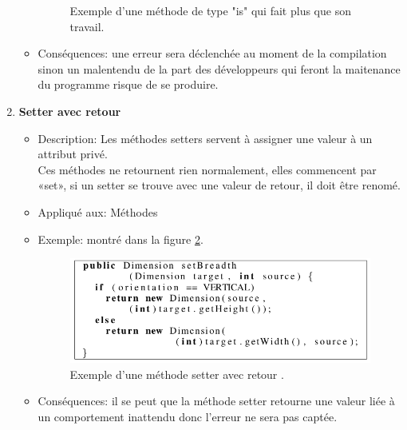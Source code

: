 \begin{enumerate}
\begin{itemize}
\begin{figure}[H]
	\caption{Exemple d'une méthode de type "is" qui fait plus que son travail\cite{arnaoudova2013new}.}
		\label{fig:un_deux}
	\end{figure}
\item Conséquences: une erreur sera déclenchée au moment de la compilation sinon un malentendu de la part des développeurs qui feront la maitenance du programme risque de se produire.
\end{itemize}

\item \textbf{Setter avec retour}
\begin{itemize}

\item Description: Les méthodes setters servent à assigner une valeur à un attribut privé.\\
Ces méthodes ne retournent rien normalement, elles commencent par «set», si un setter se trouve avec une valeur de retour, il doit être renomé.
\item Appliqué aux: Méthodes
\item Exemple: montré dans la figure \ref{fig:un_trois}.
\begin{figure}[H]
	\centering
\includegraphics[width=0.9\linewidth]{Others/Resources/un_trois.png}
	\caption{Exemple d'une méthode setter avec retour \cite{arnaoudova2013new}.}
		\label{fig:un_trois}
	\end{figure}
\item Conséquences: il se peut que la méthode setter retourne une valeur liée à un comportement inattendu donc l’erreur ne sera pas captée.

\end{itemize}


\end{enumerate}
